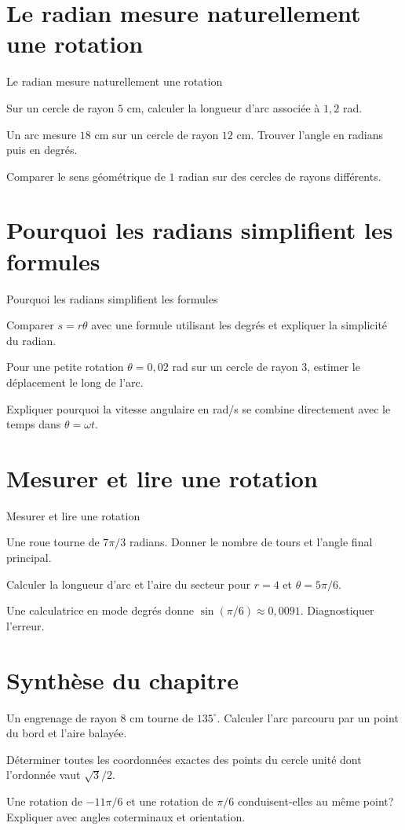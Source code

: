 \section{Le radian mesure naturellement une rotation}
\label{workbook:section:14.05}
\begin{exerciseblock}{Le radian mesure naturellement une rotation}
\item Sur un cercle de rayon $5$ cm, calculer la longueur d'arc associée à $1{,}2$ rad.
\item Un arc mesure $18$ cm sur un cercle de rayon $12$ cm. Trouver l'angle en radians puis en degrés.
\item Comparer le sens géométrique de $1$ radian sur des cercles de rayons différents.
\end{exerciseblock}
\section{Pourquoi les radians simplifient les formules}
\label{workbook:section:14.06}
\begin{exerciseblock}{Pourquoi les radians simplifient les formules}
\item Comparer $s=r\theta$ avec une formule utilisant les degrés et expliquer la simplicité du radian.
\item Pour une petite rotation $\theta=0{,}02$ rad sur un cercle de rayon $3$, estimer le déplacement le long de l'arc.
\item Expliquer pourquoi la vitesse angulaire en rad/s se combine directement avec le temps dans $\theta=\omega t$.
\end{exerciseblock}
\section{Mesurer et lire une rotation}
\label{workbook:section:14.07}
\begin{exerciseblock}{Mesurer et lire une rotation}
\item Une roue tourne de $7\pi/3$ radians. Donner le nombre de tours et l'angle final principal.
\item Calculer la longueur d'arc et l'aire du secteur pour $r=4$ et $\theta=5\pi/6$.
\item Une calculatrice en mode degrés donne $\sin(\pi/6)\approx0{,}0091$. Diagnostiquer l'erreur.
\end{exerciseblock}
\section*{Synthèse du chapitre}
\begin{synthesisbox}
\item Un engrenage de rayon $8$ cm tourne de $135^\circ$. Calculer l'arc parcouru par un point du bord et l'aire balayée.
\item Déterminer toutes les coordonnées exactes des points du cercle unité dont l'ordonnée vaut $\sqrt3/2$.
\item Une rotation de $-11\pi/6$ et une rotation de $\pi/6$ conduisent-elles au même point? Expliquer avec angles coterminaux et orientation.
\end{synthesisbox}
